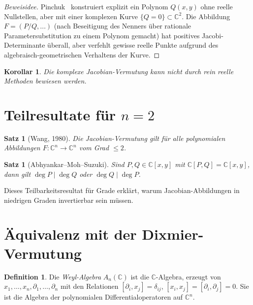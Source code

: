 \documentclass[12pt,a4paper]{amsart}
\newtheorem{satz}[theorem]{Satz}
\newtheorem{korollar}[theorem]{Korollar}
\theoremstyle{definition}
\newtheorem{definition_de}[theorem]{Definition}
\theoremstyle{remark}
\begin{document}
\begin{proof}[Beweisidee]
Pinchuk~\cite{Pin94} konstruiert explizit ein Polynom $Q(x,y)$ ohne reelle Nullstellen,
aber mit einer komplexen Kurve $\{Q = 0\} \subset \mathbb{C}^2$. Die Abbildung
$F = (P/Q, \ldots)$ (nach Beseitigung des Nenners über rationale Parametersubstitution
zu einem Polynom gemacht) hat positives Jacobi-Determinante überall, aber verfehlt
gewisse reelle Punkte aufgrund des algebraisch-geometrischen Verhaltens der Kurve.
\end{proof}

\begin{korollar}
Die komplexe Jacobian-Vermutung kann nicht durch rein reelle Methoden bewiesen werden.
\end{korollar}

\section{Teilresultate für \texorpdfstring{$n=2$}{n=2}}
\label{abschn:n2}

\begin{satz}[Wang, 1980]\label{satz:wang}
Die Jacobian-Vermutung gilt für alle polynomialen Abbildungen
$F \colon \mathbb{C}^n \to \mathbb{C}^n$ vom Grad $\leq 2$.
\end{satz}

\begin{satz}[Abhyankar--Moh--Suzuki]\label{satz:AMS}
Sind $P, Q \in \mathbb{C}[x,y]$ mit $\mathbb{C}[P,Q] = \mathbb{C}[x,y]$, dann gilt
$\deg P \mid \deg Q$ oder $\deg Q \mid \deg P$.
\end{satz}

Dieses Teilbarkeitsresultat für Grade erklärt, warum Jacobian-Abbildungen in
niedrigen Graden invertierbar sein müssen.

\section{Äquivalenz mit der Dixmier-Vermutung}
\label{abschn:dixmier}

\begin{definition_de}
Die \emph{Weyl-Algebra} $A_n(\mathbb{C})$ ist die $\mathbb{C}$-Algebra, erzeugt von
$x_1,\ldots,x_n, \partial_1, \ldots, \partial_n$ mit den Relationen
$[\partial_i, x_j] = \delta_{ij}$, $[x_i, x_j] = [\partial_i, \partial_j] = 0$.
Sie ist die Algebra der polynomialen Differentialoperatoren auf $\mathbb{C}^n$.
\end{definition_de}
\end{document}
